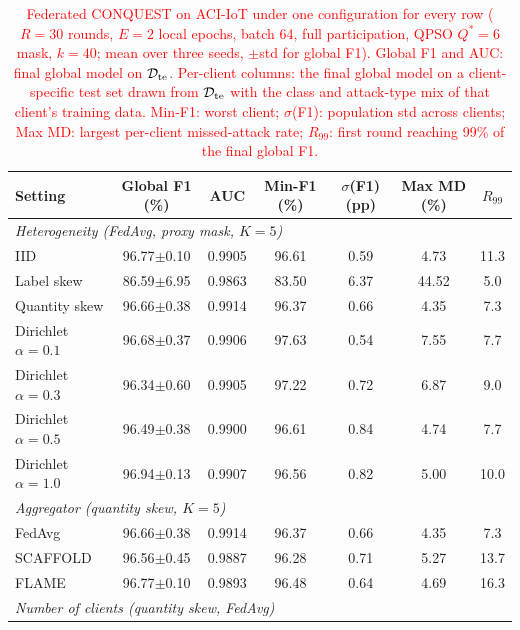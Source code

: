 \begin{table}[!t]
\centering
\caption{\textcolor{red}{Federated CONQUEST on ACI-IoT under one configuration for every
row ($R{=}30$ rounds, $E{=}2$ local epochs, batch 64, full participation, QPSO $Q^{*}{=}6$ mask, $k{=}40$; mean over
three seeds, $\pm$std for global F1). Global F1 and AUC: final global model on $\mathcal{D}_{\rm te}$. Per-client
columns: the final global model on a client-specific test set drawn from $\mathcal{D}_{\rm te}$ with the class and
attack-type mix of that client's training data. Min-F1: worst client; $\sigma$(F1): population std across clients;
Max MD: largest per-client missed-attack rate; $R_{99}$: first round reaching 99\% of the final global F1.}}
\label{tab:fl_performance_extended}
\color{red}
\setlength{\tabcolsep}{4pt}
\renewcommand{\arraystretch}{1.05}
\begin{tabular}{lcccccc}
\hline\toprule
\textbf{Setting} & \textbf{Global F1 (\%)} & \textbf{AUC} & \textbf{Min-F1 (\%)} & \textbf{$\sigma$(F1) (pp)} & \textbf{Max MD (\%)} & \textbf{$R_{99}$} \\
\hline\toprule
\multicolumn{7}{l}{\textit{Heterogeneity (FedAvg, proxy mask, $K{=}5$)}} \\
IID & 96.77$\pm$0.10 & 0.9905 & 96.61 & 0.59 & 4.73 & 11.3 \\
Label skew & 86.59$\pm$6.95 & 0.9863 & 83.50 & 6.37 & 44.52 & 5.0 \\
Quantity skew & 96.66$\pm$0.38 & 0.9914 & 96.37 & 0.66 & 4.35 & 7.3 \\
Dirichlet $\alpha{=}0.1$ & 96.68$\pm$0.37 & 0.9906 & 97.63 & 0.54 & 7.55 & 7.7 \\
Dirichlet $\alpha{=}0.3$ & 96.34$\pm$0.60 & 0.9905 & 97.22 & 0.72 & 6.87 & 9.0 \\
Dirichlet $\alpha{=}0.5$ & 96.49$\pm$0.38 & 0.9900 & 96.61 & 0.84 & 4.74 & 7.7 \\
Dirichlet $\alpha{=}1.0$ & 96.94$\pm$0.13 & 0.9907 & 96.56 & 0.82 & 5.00 & 10.0 \\
\midrule
\multicolumn{7}{l}{\textit{Aggregator (quantity skew, $K{=}5$)}} \\
FedAvg & 96.66$\pm$0.38 & 0.9914 & 96.37 & 0.66 & 4.35 & 7.3 \\
SCAFFOLD & 96.56$\pm$0.45 & 0.9887 & 96.28 & 0.71 & 5.27 & 13.7 \\
FLAME & 96.77$\pm$0.10 & 0.9893 & 96.48 & 0.64 & 4.69 & 16.3 \\
\midrule
\multicolumn{7}{l}{\textit{Number of clients (quantity skew, FedAvg)}} \\

\end{tabular}
\end{table}
